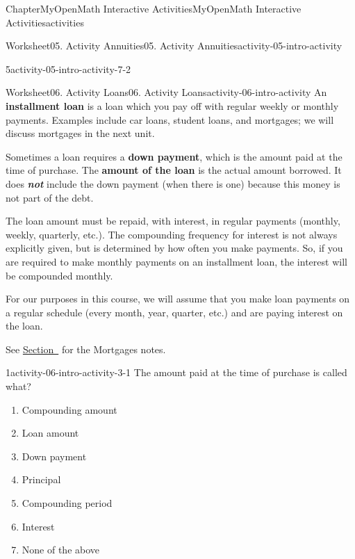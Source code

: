 \documentclass[oneside,10pt,]{book}
\newcommand{\alert}[1]{\textbf{\textit{#1}}}
\newcommand{\terminology}[1]{\textbf{#1}}
\begin{document}
\begin{chapterptx}{Chapter}{MyOpenMath Interactive Activities}{}{MyOpenMath Interactive Activities}{}{}{activities}
\begin{worksheet-section}{Worksheet}{05. Activity Annuities}{}{05. Activity Annuities}{}{}{activity-05-intro-activity}
\begin{divisionexercise}{5}{}{}{activity-05-intro-activity-7-2}
%
\end{divisionexercise}%
\end{worksheet-section}
\restoregeometry
%
%
\typeout{************************************************}
\typeout{************************************************}
%
\begin{worksheet-section}{Worksheet}{06. Activity Loans}{}{06. Activity Loans}{}{}{activity-06-intro-activity}
An \terminology{installment loan} is a loan which you pay off with regular weekly or monthly payments. Examples include car loans, student loans, and mortgages; we will discuss mortgages in the next unit.%
 \par
Sometimes a loan requires a \terminology{down payment}, which is the amount paid at the time of purchase. The \terminology{amount of the loan} is the actual amount borrowed. It does \alert{not} include the down payment (when there is one) because this money is not part of the debt.%
 \par
The loan amount must be repaid, with interest, in regular payments (monthly, weekly, quarterly, etc.). The compounding frequency for interest is not always explicitly given, but is determined by how often you make payments. So, if you are required to make monthly payments on an installment loan, the interest will be compounded monthly.%
 \par
For our purposes in this course, we will assume that you make loan payments on a regular schedule (every month, year, quarter, etc.) and are paying interest on the loan.%
 \par
See \hyperref[notes-Mortgages]{Section~} for the Mortgages notes.%
\clearpage
\begin{divisionexercise}{1}{}{}{activity-06-intro-activity-3-1}%
The amount paid at the time of purchase is called what?%
\par
%
\begin{enumerate}[label={(\alph*)}]
\item{}Compounding amount%
\item{}Loan amount%
\item{}Down payment%
\item{}Principal%
\item{}Compounding period%
\item{}Interest%
\item{}None of the above%
\end{enumerate}
%
\par\smallskip%

\end{divisionexercise}
\end{worksheet-section}
\end{chapterptx}
\end{document}
